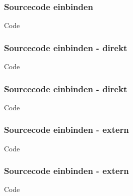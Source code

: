 \begin{frame}
    \frametitle{Sourcecode einbinden}
    \begin{block}{Code}
        
    \end{block}
\end{frame}
\begin{frame}
    \frametitle{Sourcecode einbinden - direkt}
    \begin{block}{Code}
        
    \end{block}
\end{frame}
\begin{frame}
    \frametitle{Sourcecode einbinden - direkt}
    \begin{block}{Code}
        
    \end{block}
\end{frame}
\begin{frame}
    \frametitle{Sourcecode einbinden - extern}
    \begin{block}{Code}
        
    \end{block}
\end{frame}
\begin{frame}
    \frametitle{Sourcecode einbinden - extern}
    \begin{block}{Code}
        
    \end{block}
\end{frame}

